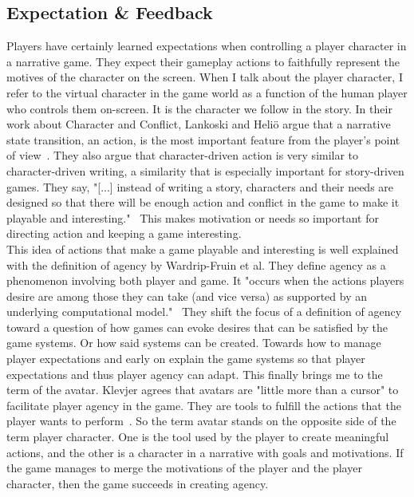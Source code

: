 \subsection{Expectation \& Feedback}
\label{section:expfee}
Players have certainly learned expectations when controlling a player character in a narrative game. They expect their gameplay actions to faithfully represent the motives of the character on the screen. When I talk about the player character, I refer to the virtual character in the game world as a function of the human player who controls them on-screen. It is the character we follow in the story. In their work about Character and Conflict, Lankoski and Heliö argue that a narrative state transition, an action, is the most important feature from the player’s point of view~\cite{Lankoski2002}. They also argue that character-driven action is very similar to character-driven writing, a similarity that is especially important for story-driven games. They say, "[...] instead of writing a story, characters and their needs are designed so that there will be enough action and conflict in the game to make it playable and interesting."~\cite{Lankoski2002} This makes motivation or needs so important for directing action and keeping a game interesting.\\
This idea of actions that make a game playable and interesting is well explained with the definition of agency by Wardrip-Fruin et al. They define agency as a phenomenon involving both player and game. It "occurs when the actions players desire are among those they can take (and vice versa) as supported by an underlying computational model."~\cite{Rohtua2009} They shift the focus of a definition of agency toward a question of how games can evoke desires that can be satisfied by the game systems. Or how said systems can be created. Towards how to manage player expectations and early on explain the game systems so that player expectations and thus player agency can adapt. This finally brings me to the term of the avatar. Klevjer agrees that avatars are "little more than a cursor" to facilitate player agency in the game. They are tools to fulfill the actions that the player wants to perform~\cite{Klevjer2012}. So the term avatar stands on the opposite side of the term player character. One is the tool used by the player to create meaningful actions, and the other is a character in a narrative with goals and motivations. If the game manages to merge the motivations of the player and the player character, then the game succeeds in creating agency.\\
